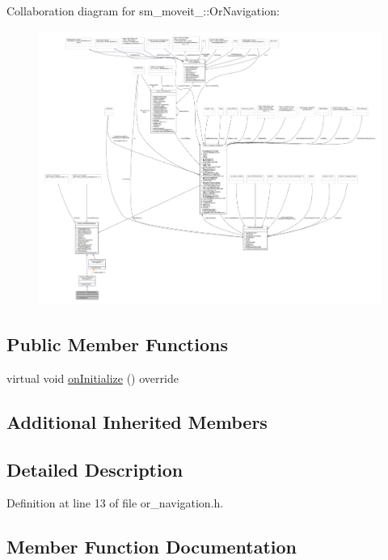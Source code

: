 Collaboration diagram for sm\+\_\+moveit\+\_\+:\+:Or\+Navigation\+:
\nopagebreak
\begin{figure}[H]
\begin{center}
\leavevmode
\includegraphics[width=350pt]{classsm__moveit__2_1_1OrNavigation__coll__graph}
\end{center}
\end{figure}
\subsection*{Public Member Functions}
\begin{DoxyCompactItemize}
\item 
virtual void \hyperlink{classsm__moveit__2_1_1OrNavigation_a3f9cd72a7a8310950a8742b6c7c103a4}{on\+Initialize} () override
\end{DoxyCompactItemize}
\subsection*{Additional Inherited Members}


\subsection{Detailed Description}


Definition at line 13 of file or\+\_\+navigation.\+h.



\subsection{Member Function Documentation}
\mbox{\label{classsm__moveit__2_1_1OrNavigation_a3f9cd72a7a8310950a8742b6c7c103a4}} 
